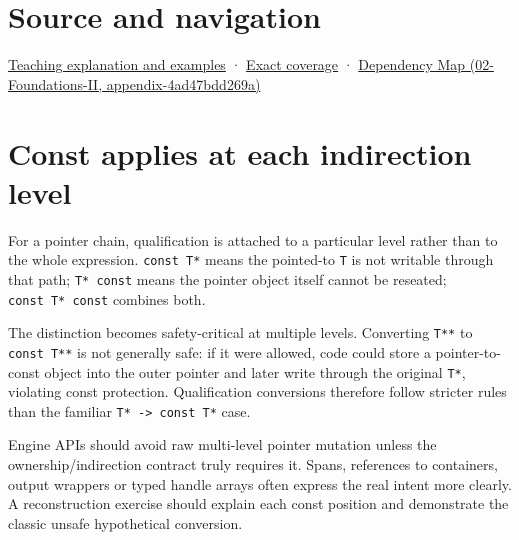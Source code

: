\section{Source and navigation}\label{appendix-5e1a7561cd98-source-and-navigation}

\href{Continuous\%20Notes/Computing\%20Foundations\%20-\%20From\%20Bits\%20to\%20C++\%20and\%20Systems\%20APIs\#Read-only\%20is\%20a\%20path,\%20not\%20an\%20ownership\%20or\%20synchronization\%20promise}{Teaching explanation and examples} · \hyperref[appendix-fd090d982a15-m008---parts-113-126]{Exact coverage} · \href{../02-Foundations-II/main.pdf\#nameddest=appendix-4ad47bdd269a}{Dependency Map (02-Foundations-II, appendix-4ad47bdd269a)}

\section{Const applies at each indirection level}\label{appendix-5e1a7561cd98-const-applies-at-each-indirection-level}

For a pointer chain, qualification is attached to a particular level rather than to the whole expression. \texttt{const\ T*} means the pointed-to \texttt{T} is not writable through that path; \texttt{T*\ const} means the pointer object itself cannot be reseated; \texttt{const\ T*\ const} combines both.

The distinction becomes safety-critical at multiple levels. Converting \texttt{T**} to \texttt{const\ T**} is not generally safe: if it were allowed, code could store a pointer-to-const object into the outer pointer and later write through the original \texttt{T*}, violating const protection. Qualification conversions therefore follow stricter rules than the familiar \texttt{T*\ -\textgreater{}\ const\ T*} case.

Engine APIs should avoid raw multi-level pointer mutation unless the ownership/indirection contract truly requires it. Spans, references to containers, output wrappers or typed handle arrays often express the real intent more clearly. A reconstruction exercise should explain each const position and demonstrate the classic unsafe hypothetical conversion.
